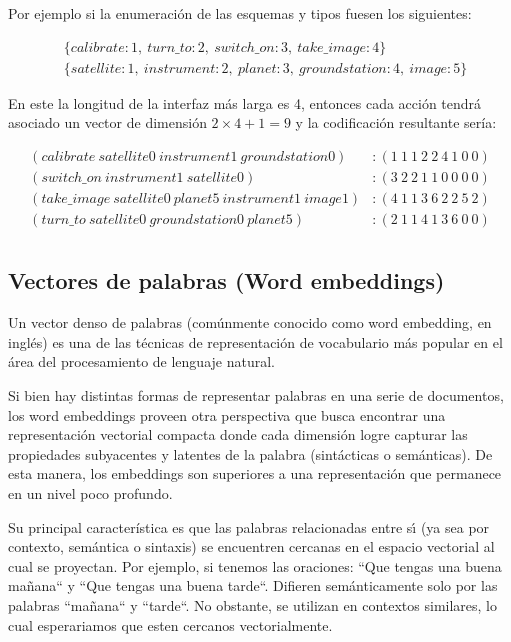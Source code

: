 Por ejemplo si la enumeración de las esquemas y tipos fuesen los siguientes:

\begin{align*}
    &\{calibrate: 1,\ turn\_to: 2,\ switch\_on:3,\ take\_image:4 \} \\
    &\{satellite: 1,\ instrument: 2,\ planet: 3,\ groundstation: 4,\ image: 5\}
\end{align*}

En este la longitud de la interfaz más larga es 4, entonces cada acción tendrá
asociado un vector de dimensión $2 \times 4 + 1 = 9$ y la codificación
resultante sería:

\begin{align*}
    (calibrate\ satellite0\ instrument1\ groundstation0) &: (1\ 1\ 1\ 2\ 2\ 4\ 1\ 0\ 0) \\
    (switch\_on\ instrument1\ satellite0) &: (3\ 2\ 2\ 1\ 1\ 0\ 0\ 0\ 0) \\
    (take\_image\ satellite0\ planet5\ instrument1\ image1) &: (4\ 1\ 1\ 3\ 6\ 2\ 2\ 5\ 2) \\
    (turn\_to\ satellite0\ groundstation0\ planet5) &: (2\ 1\ 1\ 4\ 1\ 3\ 6\ 0\ 0) \\
\end{align*}

\subsection{Vectores de palabras (Word embeddings)}

Un vector denso de palabras (comúnmente conocido como word embedding, en inglés)
es una de las técnicas de representación de vocabulario más popular en el área
del procesamiento de lenguaje natural.

Si bien hay distintas formas de representar palabras en una serie de documentos,
los word embeddings proveen otra perspectiva que busca encontrar una
representación vectorial compacta donde cada dimensión logre capturar las
propiedades subyacentes y latentes de la palabra (sintácticas o semánticas). De
esta manera, los embeddings son superiores a una representación que permanece en
un nivel poco profundo.

Su principal característica  es que las palabras relacionadas entre sı́ (ya sea
por contexto, semántica o sintaxis) se encuentren cercanas en el espacio
vectorial al cual se proyectan. Por ejemplo, si tenemos las oraciones: ``Que
tengas una buena mañana`` y ``Que tengas una buena tarde``. Difieren
semánticamente solo por las palabras ``mañana`` y ``tarde``. No obstante, se
utilizan en contextos similares, lo cual esperariamos que esten cercanos
vectorialmente.

